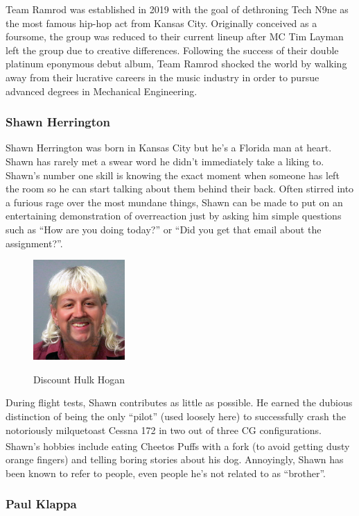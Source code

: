 \documentclass[conf]{new-aiaa}
\begin{document}
Team Ramrod was established in 2019 with the goal of dethroning Tech N9ne as the most famous hip-hop act from Kansas City. Originally conceived as a foursome, the group was reduced to their current lineup after MC Tim Layman left the group due to creative differences. Following the success of their double platinum eponymous debut album, Team Ramrod shocked the world by walking away from their lucrative careers in the music industry in order to pursue advanced degrees in Mechanical Engineering.

\subsubsection{Shawn Herrington}

Shawn Herrington was born in Kansas City but he's a Florida man at heart. Shawn has rarely met a swear word he didn't immediately take a liking to. Shawn's number one skill is knowing the exact moment when someone has left the room so he can start talking about them behind their back. Often stirred into a furious rage over the most mundane things, Shawn can be made to put on an entertaining demonstration of overreaction just by asking him simple questions such as ``How are you doing today?'' or ``Did you get that email about the assignment?''.

\begin{figure}[hbt!]
	\centering
	\includegraphics[height=1.5in]{ShawnExotic2.jpg}
	\label{PAVSLOGO}
	\caption{Discount Hulk Hogan}
\end{figure}

During flight tests, Shawn contributes as little as possible.  He earned the dubious distinction of being the only ``pilot'' (used loosely here) to successfully crash the notoriously milquetoast Cessna 172 in two out of three CG configurations. Shawn's hobbies include eating Cheetos Puffs\textsuperscript{\textregistered} with a fork (to avoid getting dusty orange fingers) and telling boring stories about his dog.  Annoyingly, Shawn has been known to refer to people, even people he's not related to as ``brother''.

\subsubsection{Paul Klappa}
\end{document}
